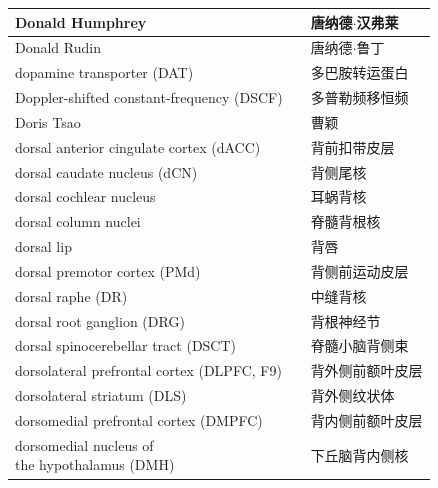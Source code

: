 \begin{longtable}{lll}
	\midrule
	Donald Humphrey    &&  唐纳德$\cdot$汉弗莱  \\
	
	\midrule
	Donald Rudin    &&  唐纳德$\cdot$鲁丁  \\
	
	\midrule
	dopamine transporter (DAT)     &&  多巴胺转运蛋白  \\
	
	\midrule
	Doppler-shifted constant-frequency (DSCF)     &&  多普勒频移恒频  \\
	
	\midrule
	Doris Tsao     &&  曹颖  \\
	
	\midrule
	dorsal anterior cingulate cortex (dACC)     &&  背前扣带皮层  \\
	
	\midrule
	dorsal caudate nucleus (dCN)     &&  背侧尾核  \\
	
	\midrule
	dorsal cochlear nucleus  && 耳蜗背核	\\
	
	\midrule
	dorsal column nuclei  && 脊髓背根核	\\
	
	\midrule
	dorsal lip     &&  背唇  \\
	
	\midrule
	dorsal premotor cortex (PMd)     &&  背侧前运动皮层  \\
	
	\midrule
	dorsal raphe (DR)     &&  中缝背核  \\
	
	\midrule
	dorsal root ganglion (DRG)     &&  背根神经节  \\
	
	\midrule
	dorsal spinocerebellar tract (DSCT)     &&  脊髓小脑背侧束  \\
	
	\midrule
	dorsolateral prefrontal cortex (DLPFC, F9)     &&  背外侧前额叶皮层  \\
	
	\midrule
	dorsolateral striatum (DLS)     &&  背外侧纹状体  \\
	
	\midrule
	dorsomedial prefrontal cortex (DMPFC)     &&  背内侧前额叶皮层  \\
	
	\midrule
	\makecell[l]{dorsomedial nucleus of \\the hypothalamus (DMH)}    &&  下丘脑背内侧核  \\
	

\end{longtable}

